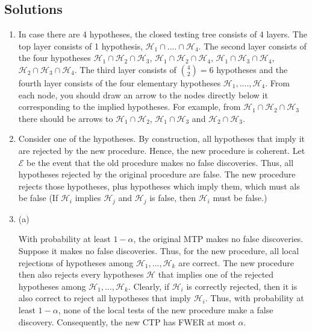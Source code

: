 \documentclass[11pt]{article}
\theoremstyle{plain}
\theoremstyle{definition}
\newcommand{\E}{\mathcal{E}}
\newcommand{\Hy}{\mathcal{H}}
\begin{document}
\begin{sols}

\subsection{Solutions}
\begin{enumerate}



\item In case there are 4 hypotheses, the closed testing tree consists of 4 layers. The top layer consists of 1 hypothesis, $\Hy_1\cap....\cap\Hy_4$. The second layer consists of the four hypotheses $\Hy_1\cap \Hy_2\cap\Hy_3$, $\Hy_1\cap \Hy_2\cap\Hy_4$, $\Hy_1\cap \Hy_3\cap\Hy_4$, $\Hy_2\cap \Hy_3\cap\Hy_4$. The third layer consists of $\binom{4}{2}=6$ hypotheses and the fourth layer consists of the four elementary hypotheses $\Hy_1,....,\Hy_4$. From each node, you should draw an arrow to the nodes directly below it corresponding to the implied hypotheses. For example, from $\Hy_1\cap \Hy_2\cap\Hy_3$ there should be arrows to $\Hy_1\cap \Hy_2$, $\Hy_1\cap\Hy_3$ and $\Hy_2\cap\Hy_3$.


\item Consider one of the hypotheses. By construction, all hypotheses that imply it are rejected by the new procedure. Hence, the new procedure is coherent.
Let $\E$ be the event that the old procedure makes no false discoveries. Thus, all hypotheses rejected by the original procedure are false. The new procedure rejects those hypotheses, plus hypotheses which imply them, which must als be false (If $\Hy_i$ implies $\Hy_j$ and  $\Hy_j$ is false, then $\Hy_i$ must be false.)


\item (a)


With probability at least $1-\alpha$, the original MTP makes no false discoveries. Suppose it makes no false discoveries.   Thus, for the new procedure, all local rejections of hypotheses among $\Hy_1,...,\Hy_k$ are correct. The new procedure then also rejects every hypotheses $\Hy$ that implies one of  the rejected hypotheses among $\Hy_1,...,\Hy_k$. Clearly, if $\Hy_i$ is correctly rejected, then it is also correct to reject all hypotheses that imply $\Hy_i$. Thus, with probability at least $1-\alpha$, none of the local tests of the new procedure make a false discovery. Consequently, the new CTP has FWER at most $\alpha$. 




\end{enumerate}
\end{sols}
\end{document}
